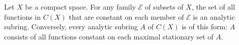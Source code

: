 Let $X$ be a compact space. For any family $\mathcal{E}$ of subsets of $X$, the set of all functions in $C(X)$ that are constant on each member of $\mathcal{E}$ is an analytic subring. Conversely, every analytic subring $A$ of $C(X)$ is of this form: $A$ consists of all functions constant on each maximal stationary set of $A$.
